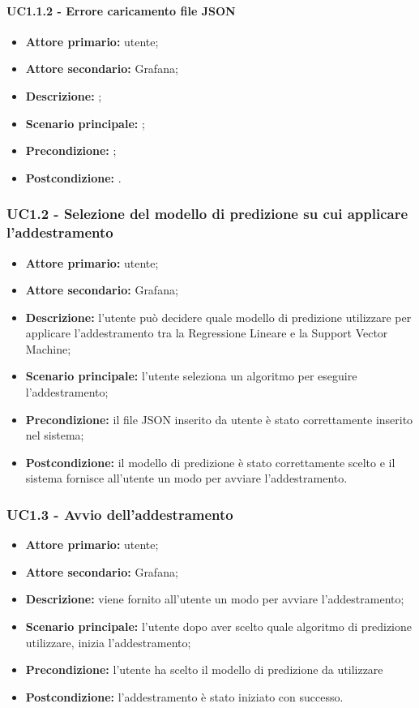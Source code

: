 \documentclass{article}
\begin{document}
	\paragraph{UC1.1.2 - Errore caricamento file JSON}
	\begin{itemize}
		\item \textbf{Attore primario:} utente;
		\item \textbf{Attore secondario:} Grafana;
		\item \textbf{Descrizione:} ;
		\item \textbf{Scenario principale:} ;
		\item \textbf{Precondizione:} ;
		\item \textbf{Postcondizione:} .
	\end{itemize}

	\subsubsection{UC1.2 - Selezione del modello di predizione su cui applicare l'addestramento}
	\begin{itemize}
		\item \textbf{Attore primario:} utente;
		\item \textbf{Attore secondario:} Grafana;
		\item \textbf{Descrizione:} l'utente può decidere quale modello di predizione utilizzare per applicare l'addestramento tra la Regressione Lineare e la Support Vector Machine;
		\item \textbf{Scenario principale:} l'utente seleziona un algoritmo per eseguire l'addestramento;
		\item \textbf{Precondizione:} il file JSON inserito da utente è stato correttamente inserito nel sistema;
		\item \textbf{Postcondizione:} il modello di predizione è stato correttamente scelto e il sistema fornisce all'utente un modo per avviare l'addestramento.
	\end{itemize}

	\subsubsection{UC1.3 - Avvio dell'addestramento}
	\begin{itemize}
		\item \textbf{Attore primario:} utente;
		\item \textbf{Attore secondario:} Grafana;
		\item \textbf{Descrizione:} viene fornito all'utente un modo per avviare l'addestramento;
		\item \textbf{Scenario principale:} l'utente dopo aver scelto quale algoritmo di predizione utilizzare, inizia l'addestramento; 
		\item \textbf{Precondizione:} l'utente ha scelto il modello di predizione da utilizzare
		\item \textbf{Postcondizione:} l'addestramento è stato iniziato con successo.
	\end{itemize}
\end{document}
